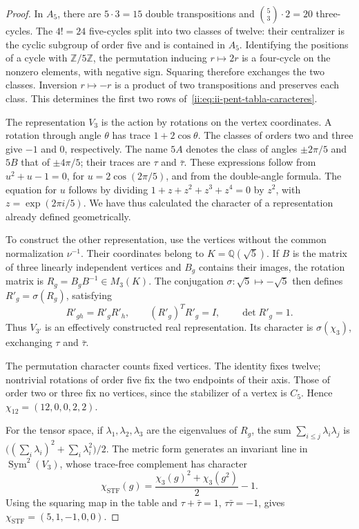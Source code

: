 \begin{proof}
In \(A_5\), there are \(5\cdot3=15\) double transpositions and
\(\binom53\cdot2=20\) three-cycles.
The \(4!=24\) five-cycles split into two classes of
twelve: their centralizer is the cyclic subgroup of order five and is
contained in \(A_5\). Identifying the positions of a cycle
with \(\mathbb Z/5\mathbb Z\), the permutation inducing
\(r\mapsto2r\) is a four-cycle on the nonzero
elements, with negative sign. Squaring therefore exchanges the two
classes. Inversion \(r\mapsto-r\) is a product of two
transpositions and preserves each class. This determines the first two
rows of~\eqref{ii:eq:ii-pent-tabla-caracteres}.

The representation \(V_3\) is the action by rotations on the
vertex coordinates. A rotation through angle \(\theta\)
has trace \(1+2\cos\theta\). The classes of orders two and three
give \(-1\) and \(0\), respectively. The name \(5A\) denotes the
class of angles \(\pm2\pi/5\) and \(5B\) that of
\(\pm4\pi/5\); their traces are \(\tau\) and \(\bar\tau\).
These expressions follow from
\(u^2+u-1=0\), for \(u=2\cos(2\pi/5)\), and from the double-angle
formula. The equation for \(u\) follows by dividing
\(1+z+z^2+z^3+z^4=0\) by \(z^2\), with
\(z=\exp(2\pi i/5)\). We have thus calculated the character of a
representation already defined geometrically.

To construct the other representation, use the vertices without the
common normalization \(\nu^{-1}\). Their coordinates belong to
\(K=\mathbb Q(\sqrt5)\). If \(B\) is the matrix of three linearly
independent vertices and \(B_g\) contains their images, the
rotation matrix is \(R_g=B_gB^{-1}\in M_3(K)\).
The conjugation \(\sigma:\sqrt5\mapsto-\sqrt5\) then defines
\(R'_g=\sigma(R_g)\), satisfying
\[
 R'_{gh}=R'_gR'_h,\qquad
 (R'_g)^TR'_g=I,\qquad \det R'_g=1.
\]
Thus \(V_{3'}\) is an effectively constructed real
representation. Its character is \(\sigma(\chi_3)\), exchanging
\(\tau\) and \(\bar\tau\).

The permutation character counts fixed vertices. The identity fixes
twelve; nontrivial rotations of order five fix the two endpoints
of their axis. Those of order two or three fix no vertices, since the
stabilizer of a vertex is \(C_5\). Hence
\(\chi_{12}=(12,0,0,2,2)\).

For the tensor space, if \(\lambda_1,\lambda_2,\lambda_3\)
are the eigenvalues of \(R_g\), the sum
\(\sum_{i\leq j}\lambda_i\lambda_j\) is
\(\bigl((\sum_i\lambda_i)^2+\sum_i\lambda_i^2\bigr)/2\).
The metric form generates an invariant line in
\(\operatorname{Sym}^2(V_3)\), whose trace-free complement has
character
\begin{equation}
\label{ii:eq:ii-pent-caracter-stf}
 \chi_{\mathrm{STF}}(g)
 =\frac{\chi_3(g)^2+\chi_3(g^2)}2-1.
\end{equation}
Using the squaring map in the table and
\(\tau+\bar\tau=1\), \(\tau\bar\tau=-1\), gives
\(\chi_{\mathrm{STF}}=(5,1,-1,0,0)\).


\end{proof}
